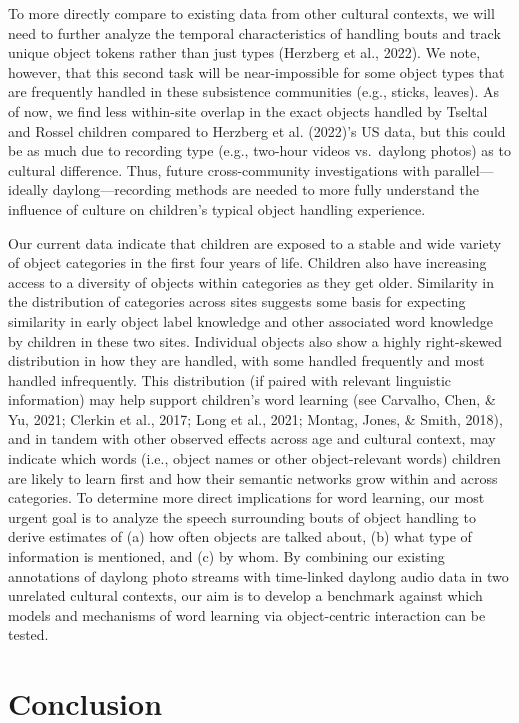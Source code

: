 \documentclass[10pt, letterpaper]{article}
\begin{document}
To more directly compare to existing data from other cultural contexts,
we will need to further analyze the temporal characteristics of handling
bouts and track unique object tokens rather than just types (Herzberg et
al., 2022). We note, however, that this second task will be
near-impossible for some object types that are frequently handled in
these subsistence communities (e.g., sticks, leaves). As of now, we find
less within-site overlap in the exact objects handled by Tseltal and
Rossel children compared to Herzberg et al. (2022)'s US data, but this
could be as much due to recording type (e.g., two-hour videos
vs.~daylong photos) as to cultural difference. Thus, future
cross-community investigations with parallel---ideally
daylong---recording methods are needed to more fully understand the
influence of culture on children's typical object handling experience.

Our current data indicate that children are exposed to a stable and wide
variety of object categories in the first four years of life. Children
also have increasing access to a diversity of objects within categories
as they get older. Similarity in the distribution of categories across
sites suggests some basis for expecting similarity in early object label
knowledge and other associated word knowledge by children in these two
sites. Individual objects also show a highly right-skewed distribution
in how they are handled, with some handled frequently and most handled
infrequently. This distribution (if paired with relevant linguistic
information) may help support children's word learning (see Carvalho,
Chen, \& Yu, 2021; Clerkin et al., 2017; Long et al., 2021; Montag,
Jones, \& Smith, 2018), and in tandem with other observed effects across
age and cultural context, may indicate which words (i.e., object names
or other object-relevant words) children are likely to learn first and
how their semantic networks grow within and across categories. To
determine more direct implications for word learning, our most urgent
goal is to analyze the speech surrounding bouts of object handling to
derive estimates of (a) how often objects are talked about, (b) what
type of information is mentioned, and (c) by whom. By combining our
existing annotations of daylong photo streams with time-linked daylong
audio data in two unrelated cultural contexts, our aim is to develop a
benchmark against which models and mechanisms of word learning via
object-centric interaction can be tested.

\hypertarget{conclusion}{%
\section{Conclusion}\label{conclusion}}
\end{document}
